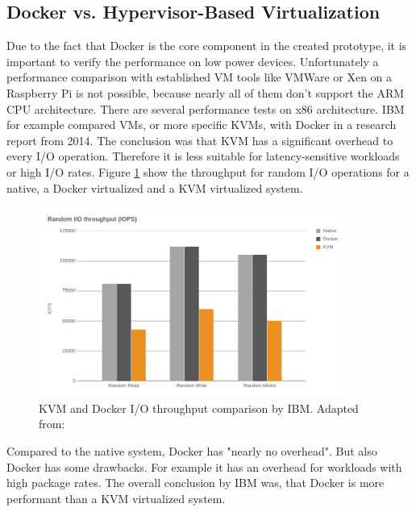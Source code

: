 \subsection{Docker vs. Hypervisor-Based Virtualization}
Due to the fact that Docker is the core component in the created prototype, it is important to verify the performance on low power devices.
Unfortunately a performance comparison with established \ac{VM} tools like VMWare or Xen on a Raspberry Pi is not possible, because nearly all of them don't support the ARM \ac{CPU} architecture.
There are several performance tests on x86 architecture.
IBM for example compared \acp{VM}, or more specific \acp{KVM}, with Docker in a research report\autocite{IBM:Performance:2014} from 2014.
The conclusion was that \ac{KVM} has a significant overhead to every I/O operation.
Therefore it is less suitable for latency-sensitive workloads or high I/O rates.
Figure \ref{fig:ibm_kvm_docker_io} show the throughput for random I/O operations for a native, a Docker virtualized and a \ac{KVM} virtualized system.

\begin{figure}[H]
    \centering
    \includegraphics[width=0.9\textwidth]{resources/images/performance_ibm_kvm_docker_io.png}
    \caption[KVM and Docker I/O throughput comparison by IBM]{KVM and Docker I/O throughput comparison by IBM. Adapted from: \autocite[p. 6]{IBM:Performance:2014}}
    \label{fig:ibm_kvm_docker_io}
\end{figure}

Compared to the native system, Docker has "nearly no overhead"\autocite[p. 6]{IBM:Performance:2014}.
But also Docker has some drawbacks.
For example it has an overhead for workloads with high package rates.\autocite[cf.][p. 6]{IBM:Performance:2014}
The overall conclusion by IBM was, that Docker is more performant than a \ac{KVM} virtualized system.\newline

